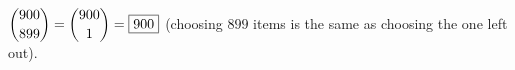 $\dbinom{900}{899}=\dbinom{900}{1}=\boxed{900}$ (choosing $899$ items is the same as choosing the one left out).
